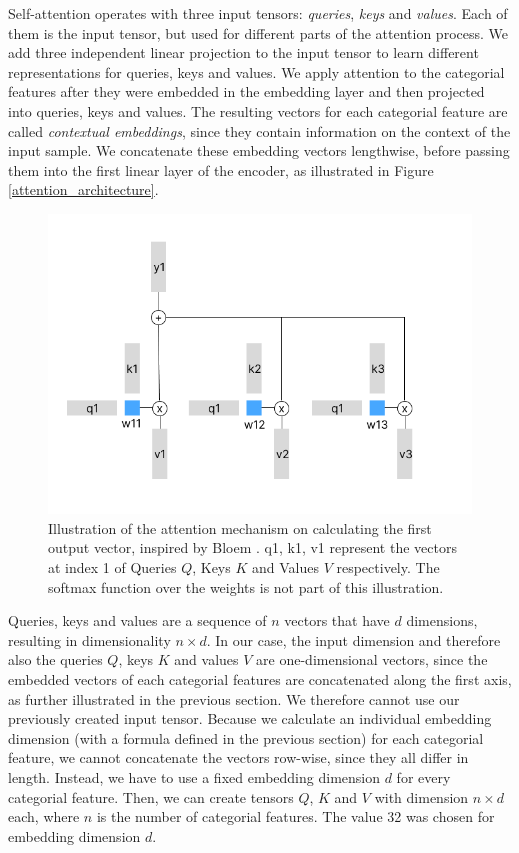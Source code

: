 Self-attention operates with three input tensors: \textit{queries}, \textit{keys} and \textit{values}. Each of them is the input tensor, but used for different parts of the attention process. We add three independent linear projection to the input tensor to learn different representations for queries, keys and values. We apply attention to the categorial features after they were embedded in the embedding layer and then projected into queries, keys and values. The resulting vectors for each categorial feature are called \textit{contextual embeddings}, since they contain information on the context of the input sample. We concatenate these embedding vectors lengthwise, before passing them into the first linear layer of the encoder, as illustrated in Figure \ref{attention_architecture}.

\begin{figure}
\centering
	\includegraphics[width=1.1\linewidth]{attention_illustrated.png}
	\caption{Illustration of the attention mechanism on calculating the first output vector, inspired by Bloem \cite{transformers_from_scratch}. q1, k1, v1 represent the vectors at index 1 of Queries $Q$, Keys $K$ and Values $V$ respectively. The softmax function over the weights is not part of this illustration.}
	\label{attention_illustrated}
\end{figure}

Queries, keys and values are a sequence of $n$ vectors that have $d$ dimensions, resulting in dimensionality $n \times d$. In our case, the input dimension and therefore also the queries $Q$, keys $K$ and values $V$ are one-dimensional vectors, since the embedded vectors of each categorial features are concatenated along the first axis, as further illustrated in the previous section. We therefore cannot use our previously created input tensor. Because we calculate an individual embedding dimension (with a formula defined in the previous section) for each categorial feature, we cannot concatenate the vectors row-wise, since they all differ in length. Instead, we have to use a fixed embedding dimension $d$ for every categorial feature. Then, we can create tensors $Q$, $K$ and $V$ with dimension $n \times d$ each, where $n$ is the number of categorial features. The value 32 was chosen for embedding dimension $d$.

